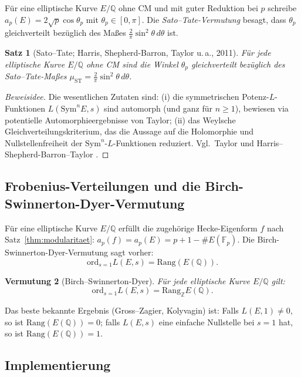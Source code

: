 \documentclass[12pt,a4paper]{amsart}
\newtheorem{theorem}{Satz}[section]
\newtheorem{conjecture}[theorem]{Vermutung}
\theoremstyle{definition}
\begin{document}
F\"ur eine elliptische Kurve $E/\mathbb{Q}$ ohne CM und mit guter Reduktion
bei $p$ schreibe $a_p(E) = 2\sqrt{p}\cos\theta_p$ mit $\theta_p \in [0,\pi]$.
Die \emph{Sato--Tate-Vermutung} besagt, dass $\theta_p$ gleichverteilt
bez\"uglich des Ma{\ss}es $\frac{2}{\pi}\sin^2\theta\,d\theta$ ist.

\begin{theorem}[Sato--Tate; Harris, Shepherd-Barron, Taylor u.\,a., 2011]
  F\"ur jede elliptische Kurve $E/\mathbb{Q}$ ohne CM sind die Winkel $\theta_p$
  gleichverteilt bez\"uglich des Sato--Tate-Ma{\ss}es
  $\mu_{\mathrm{ST}} = \frac{2}{\pi}\sin^2\theta\,d\theta$.
\end{theorem}

\begin{proof}[Beweisidee]
  Die wesentlichen Zutaten sind: (i) die symmetrischen Potenz-$L$-Funktionen
  $L(\mathrm{Sym}^n E, s)$ sind automorph (und ganz f\"ur $n \ge 1$), bewiesen
  via potentielle Automorphieergebnisse von Taylor; (ii) das Weylsche
  Gleichverteilungskriterium, das die Aussage auf die Holomorphie und
  Nullstellenfreiheit der $\mathrm{Sym}^n$-$L$-Funktionen reduziert.
  Vgl.\ Taylor \cite{Taylor} und Harris--Shepherd-Barron--Taylor \cite{HST}.
\end{proof}

\subsection{Frobenius-Verteilungen und die Birch-Swinnerton-Dyer-Vermutung}

F\"ur eine elliptische Kurve $E/\mathbb{Q}$ erf\"ullt die zugeh\"orige Hecke-Eigenform
$f$ nach Satz~\ref{thm:modularitaet}: $a_p(f) = a_p(E) = p+1-\#E(\mathbb{F}_p)$.
Die Birch-Swinnerton-Dyer-Vermutung sagt vorher:
\[
  \mathrm{ord}_{s=1} L(E,s) = \mathrm{Rang}(E(\mathbb{Q})).
\]

\begin{conjecture}[Birch--Swinnerton-Dyer]\label{conj:bsd}
  F\"ur jede elliptische Kurve $E/\mathbb{Q}$ gilt:
  \[
    \mathrm{ord}_{s=1} L(E,s) = \mathrm{Rang}_{\mathbb{Z}} E(\mathbb{Q}).
  \]
\end{conjecture}

Das beste bekannte Ergebnis (Gross--Zagier, Kolyvagin) ist: Falls $L(E,1) \ne 0$,
so ist $\mathrm{Rang}(E(\mathbb{Q})) = 0$; falls $L(E,s)$ eine einfache Nullstelle
bei $s=1$ hat, so ist $\mathrm{Rang}(E(\mathbb{Q})) = 1$.

\subsection{Implementierung}
\end{document}
